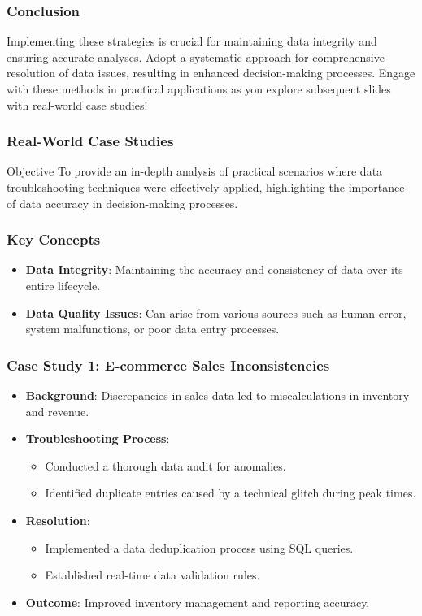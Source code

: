 \documentclass{beamer}
\begin{document}
\begin{frame}[fragile]
    \frametitle{Conclusion}
    Implementing these strategies is crucial for maintaining data integrity and ensuring accurate analyses. Adopt a systematic approach for comprehensive resolution of data issues, resulting in enhanced decision-making processes. Engage with these methods in practical applications as you explore subsequent slides with real-world case studies!
\end{frame}

\begin{frame}[fragile]
    \frametitle{Real-World Case Studies}
    \begin{block}{Objective}
        To provide an in-depth analysis of practical scenarios where data troubleshooting techniques were effectively applied, highlighting the importance of data accuracy in decision-making processes.
    \end{block}
\end{frame}

\begin{frame}[fragile]
    \frametitle{Key Concepts}
    \begin{itemize}
        \item \textbf{Data Integrity}: Maintaining the accuracy and consistency of data over its entire lifecycle.
        \item \textbf{Data Quality Issues}: Can arise from various sources such as human error, system malfunctions, or poor data entry processes.
    \end{itemize}
\end{frame}

\begin{frame}[fragile]
    \frametitle{Case Study 1: E-commerce Sales Inconsistencies}
    \begin{itemize}
        \item \textbf{Background}: Discrepancies in sales data led to miscalculations in inventory and revenue.
        \item \textbf{Troubleshooting Process}:
            \begin{itemize}
                \item Conducted a thorough data audit for anomalies.
                \item Identified duplicate entries caused by a technical glitch during peak times.
            \end{itemize}
        \item \textbf{Resolution}:
            \begin{itemize}
                \item Implemented a data deduplication process using SQL queries.
                \item Established real-time data validation rules.
            \end{itemize}
        \item \textbf{Outcome}: Improved inventory management and reporting accuracy.
    \end{itemize}
\end{frame}
\end{document}
